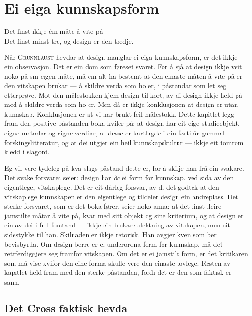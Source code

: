 \chapter{Ei eiga kunnskapsform}

\begin{motto}
Det finst ikkje éin måte å vite på.\\ Det finst minst tre, og design er den tredje.
\end{motto}

Når \textsc{Grunnlaust} hevdar at design manglar ei eiga kunnskapsform, er det ikkje ein observasjon. Det er ein dom som føreset svaret. For å sjå at design ikkje veit noko på sin eigen måte, må ein alt ha bestemt at den einaste måten å vite på er den vitskapen brukar — å skildre verda som ho er, i påstandar som let seg etterprøve. Mot den målestokken kjem design til kort, av di design ikkje held på med å skildre verda som ho er. Men då er ikkje konklusjonen at design er utan kunnskap. Konklusjonen er at vi har brukt feil målestokk. Dette kapitlet legg fram den positive påstanden boka kviler på: at design har eit eige studieobjekt, eigne metodar og eigne verdiar, at desse er kartlagde i ein førti år gammal forskingslitteratur, og at dei utgjer ein heil kunnskapskultur — ikkje eit tomrom kledd i slagord.

Eg vil vere tydeleg på kva slags påstand dette er, for å skilje han frå ein svakare. Det svake forsvaret seier: design har \emph{òg} ei form for kunnskap, ved sida av den eigentlege, vitskaplege. Det er eit dårleg forsvar, av di det godtek at den vitskaplege kunnskapen er den eigentlege og tildeler design ein andreplass. Det sterke forsvaret, som er det boka fører, seier noko anna: at det finst fleire jamstilte måtar å vite på, kvar med sitt objekt og sine kriterium, og at design er ein av dei i full forstand — ikkje ein blekare slektning av vitskapen, men eit sidestykke til han. Skilnaden er ikkje retorisk. Han avgjer kven som ber bevisbyrda. Om design berre er ei underordna form for kunnskap, må det rettferdiggjere seg framfor vitskapen. Om det er ei jamstilt form, er det kritikaren som må vise kvifor den eine forma skulle vere den einaste lovlege. Resten av kapitlet held fram med den sterke påstanden, fordi det er den som faktisk er sann.

\section{Det Cross faktisk hevda}

